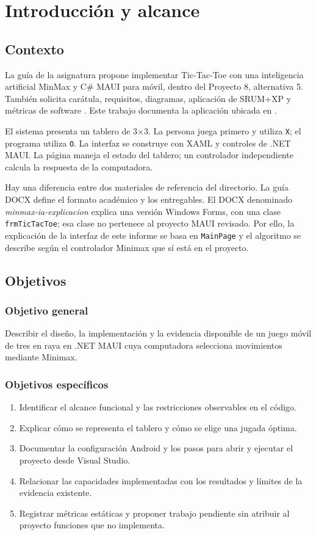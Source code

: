 \chapter{Introducción y alcance}
\section{Contexto}
La guía de la asignatura propone implementar Tic-Tac-Toe con una inteligencia artificial MinMax y C\# MAUI para móvil, dentro del Proyecto 8, alternativa 5. También solicita carátula, requisitos, diagramas, aplicación de SRUM+XP y métricas de software \cite{guia}. Este trabajo documenta la aplicación ubicada en .

El sistema presenta un tablero de 3$\times$3. La persona juega primero y utiliza \texttt{X}; el programa utiliza \texttt{O}. La interfaz se construye con XAML y controles de .NET MAUI. La página maneja el estado del tablero; un controlador independiente calcula la respuesta de la computadora.

Hay una diferencia entre dos materiales de referencia del directorio. La guía DOCX define el formato académico y los entregables. El DOCX denominado \emph{minmax-ia-explicacion} explica una versión Windows Forms, con una clase \texttt{frmTicTacToe}; esa clase no pertenece al proyecto MAUI revisado. Por ello, la explicación de la interfaz de este informe se basa en \texttt{MainPage} y el algoritmo se describe según el controlador Minimax que sí está en el proyecto.

\section{Objetivos}
\subsection{Objetivo general}
Describir el diseño, la implementación y la evidencia disponible de un juego móvil de tres en raya en .NET MAUI cuya computadora selecciona movimientos mediante Minimax.

\subsection{Objetivos específicos}
\begin{enumerate}
  \item Identificar el alcance funcional y las restricciones observables en el código.
  \item Explicar cómo se representa el tablero y cómo se elige una jugada óptima.
  \item Documentar la configuración Android y los pasos para abrir y ejecutar el proyecto desde Visual Studio.
  \item Relacionar las capacidades implementadas con los resultados y límites de la evidencia existente.
  \item Registrar métricas estáticas y proponer trabajo pendiente sin atribuir al proyecto funciones que no implementa.
\end{enumerate}

